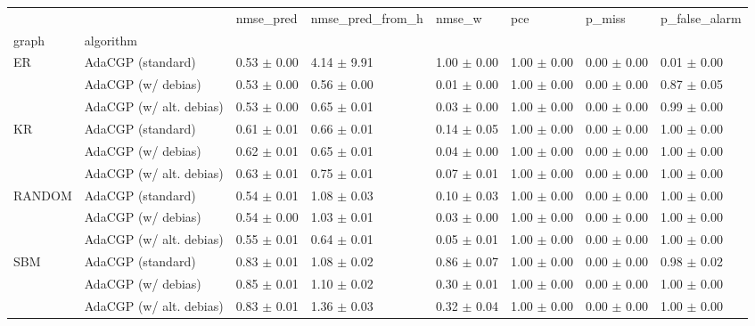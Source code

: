 \begin{tabular}{llllllll}
\toprule
    &                         &        nmse_pred & nmse_pred_from_h &           nmse_w &              pce &           p_miss &    p_false_alarm \\
graph & algorithm &                  &                  &                  &                  &                  &                  \\
\midrule
ER & AdaCGP (standard) &  0.53 $\pm$ 0.00 &  4.14 $\pm$ 9.91 &  1.00 $\pm$ 0.00 &  1.00 $\pm$ 0.00 &  0.00 $\pm$ 0.00 &  0.01 $\pm$ 0.00 \\
    & AdaCGP (w/ debias) &  0.53 $\pm$ 0.00 &  0.56 $\pm$ 0.00 &  0.01 $\pm$ 0.00 &  1.00 $\pm$ 0.00 &  0.00 $\pm$ 0.00 &  0.87 $\pm$ 0.05 \\
    & AdaCGP (w/ alt. debias) &  0.53 $\pm$ 0.00 &  0.65 $\pm$ 0.01 &  0.03 $\pm$ 0.00 &  1.00 $\pm$ 0.00 &  0.00 $\pm$ 0.00 &  0.99 $\pm$ 0.00 \\
KR & AdaCGP (standard) &  0.61 $\pm$ 0.01 &  0.66 $\pm$ 0.01 &  0.14 $\pm$ 0.05 &  1.00 $\pm$ 0.00 &  0.00 $\pm$ 0.00 &  1.00 $\pm$ 0.00 \\
    & AdaCGP (w/ debias) &  0.62 $\pm$ 0.01 &  0.65 $\pm$ 0.01 &  0.04 $\pm$ 0.00 &  1.00 $\pm$ 0.00 &  0.00 $\pm$ 0.00 &  1.00 $\pm$ 0.00 \\
    & AdaCGP (w/ alt. debias) &  0.63 $\pm$ 0.01 &  0.75 $\pm$ 0.01 &  0.07 $\pm$ 0.01 &  1.00 $\pm$ 0.00 &  0.00 $\pm$ 0.00 &  1.00 $\pm$ 0.00 \\
RANDOM & AdaCGP (standard) &  0.54 $\pm$ 0.01 &  1.08 $\pm$ 0.03 &  0.10 $\pm$ 0.03 &  1.00 $\pm$ 0.00 &  0.00 $\pm$ 0.00 &  1.00 $\pm$ 0.00 \\
    & AdaCGP (w/ debias) &  0.54 $\pm$ 0.00 &  1.03 $\pm$ 0.01 &  0.03 $\pm$ 0.00 &  1.00 $\pm$ 0.00 &  0.00 $\pm$ 0.00 &  1.00 $\pm$ 0.00 \\
    & AdaCGP (w/ alt. debias) &  0.55 $\pm$ 0.01 &  0.64 $\pm$ 0.01 &  0.05 $\pm$ 0.01 &  1.00 $\pm$ 0.00 &  0.00 $\pm$ 0.00 &  1.00 $\pm$ 0.00 \\
SBM & AdaCGP (standard) &  0.83 $\pm$ 0.01 &  1.08 $\pm$ 0.02 &  0.86 $\pm$ 0.07 &  1.00 $\pm$ 0.00 &  0.00 $\pm$ 0.00 &  0.98 $\pm$ 0.02 \\
    & AdaCGP (w/ debias) &  0.85 $\pm$ 0.01 &  1.10 $\pm$ 0.02 &  0.30 $\pm$ 0.01 &  1.00 $\pm$ 0.00 &  0.00 $\pm$ 0.00 &  1.00 $\pm$ 0.00 \\
    & AdaCGP (w/ alt. debias) &  0.83 $\pm$ 0.01 &  1.36 $\pm$ 0.03 &  0.32 $\pm$ 0.04 &  1.00 $\pm$ 0.00 &  0.00 $\pm$ 0.00 &  1.00 $\pm$ 0.00 \\
\bottomrule
\end{tabular}
